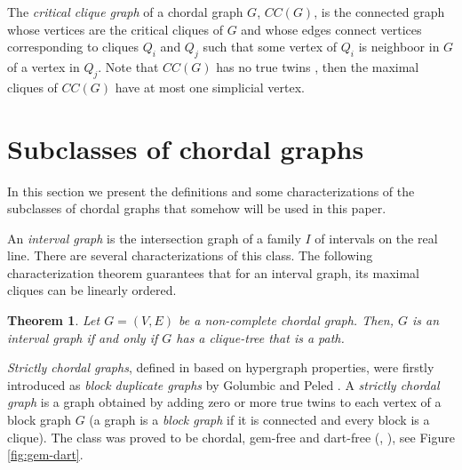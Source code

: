 \documentclass[preprint,12pt]{elsarticle}
\newtheorem{theorem}{Theorem}
\begin{document}
The \textit{critical clique graph}\/  of a chordal graph $G$, $CC(G)$,  is the
connected  graph whose vertices are the critical cliques of $G$ and whose
edges connect vertices corresponding to  cliques $Q_i$ and $Q_j$ such that
some vertex of $Q_i$ is  neighboor in $G$ of a vertex in $Q_j$.
Note that $CC(G)$ has no true twins \cite{BW10}, then the maximal cliques of $CC(G)$ have at most one
simplicial vertex.


\section{Subclasses of chordal graphs}

In this section we present the definitions and some characterizations of the subclasses of chordal graphs 
that somehow will be used in this paper.

An \textit{interval graph} is the intersection graph of a family $I$ of intervals on the real line. 
There are several characterizations of this class. 
The following characterization theorem guarantees that for an interval graph,
 its maximal cliques can be linearly ordered.

\begin{theorem}\label{theo:charact-IG2}  {\rm\cite{GH64}}
Let  $G=(V,E)$ be a non-complete chordal  graph. Then, 
$G$ is an interval graph if and only if $G$ has a  clique-tree that
is a  path. 
\end{theorem} 



\textit{Strictly chordal graphs}, defined in \cite{K05} based on hypergraph properties,  
were firstly introduced as \textit{block duplicate graphs}  by  Golumbic and Peled \cite{GP02}.
A \textit{strictly chordal  graph} is a graph obtained by adding zero or more true twins 
to each vertex of a block graph $G$ 
(a graph is a \textit{block graph} \cite{H63}  if it is connected and every block is a clique).
 The  class was proved to be chordal,  gem-free and dart-free (\cite{GP02}, \cite{K05}), see Figure \ref{fig:gem-dart}.

\bigskip
\end{document}
